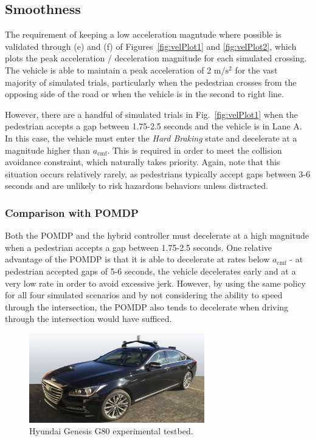 \documentclass[letterpaper, 10 pt, conference]{ieeeconf}  %
\begin{document}
\subsection{Smoothness}
The requirement of keeping a low acceleration magntude where possible is validated through (e) and (f) of Figures~\ref{fig:velPlot1} and \ref{fig:velPlot2}, which plots the peak acceleration / deceleration magnitude for each simulated crossing. The vehicle is able to maintain a peak acceleration of 2 $\mathrm{m/s^2}$ for the vast majority of simulated trials, particularly when the pedestrian crosses from the opposing side of the road or when the vehicle is in the second to right line.

However, there are a handful of simulated trials in Fig.~\ref{fig:velPlot1} when the pedestrian accepts a gap between 1.75-2.5 seconds and the vehicle is in Lane A. In this case, the vehicle must enter the \textit{Hard Braking} state and decelerate at a magnitude higher than $a_\mathrm{cmf}$. This is required in order to meet the collision avoidance constraint, which naturally takes priority. Again, note that this situation occurs relatively rarely, as pedestrians typically accept gaps between 3-6 seconds and are unlikely to risk hazardous behaviors unless distracted. 

\subsubsection{Comparison with POMDP}
Both the POMDP and the hybrid controller must decelerate at a high magnitude when a pedestrian accepts a gap between 1.75-2.5 seconds. One relative advantage of the POMDP is that it is able to decelerate at rates below $a_\mathrm{cmf}$ - at pedestrian accepted gaps of 5-6 seconds, the vehicle decelerates early and at a very low rate in order to avoid excessive jerk. However, by using the same policy for all four simulated scenarios and by not considering the ability to speed through the intersection, the POMDP also tends to decelerate when driving through the intersection would have sufficed. 

\begin{figure}[h]
\centering
\includegraphics[width=3.0in]{figures/G80.jpg}
\caption{Hyundai Genesis G80 experimental testbed.}
\label{fig:g80}
\end{figure}
\end{document}
